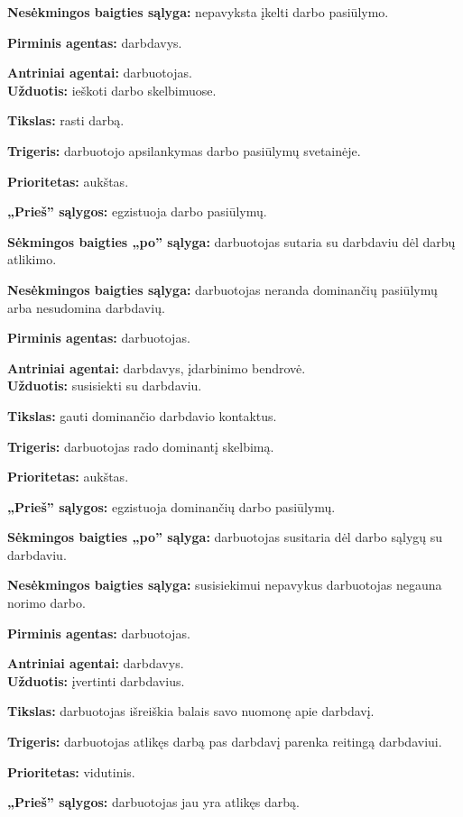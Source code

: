 \documentclass{VUMIFPSkursinis}
\begin{document}
\textbf{Nesėkmingos baigties sąlyga:} nepavyksta įkelti darbo pasiūlymo.

\textbf{Pirminis agentas:} darbdavys.

\textbf{Antriniai agentai:} darbuotojas.
\\

\textbf{Užduotis:} ieškoti darbo skelbimuose.

\textbf{Tikslas:} rasti darbą.

\textbf{Trigeris:} darbuotojo apsilankymas darbo pasiūlymų svetainėje.

\textbf{Prioritetas:} aukštas.

\textbf{„Prieš” sąlygos:} egzistuoja darbo pasiūlymų.

\textbf{Sėkmingos baigties „po” sąlyga:} darbuotojas sutaria su darbdaviu dėl darbų atlikimo.

\textbf{Nesėkmingos baigties sąlyga:} darbuotojas neranda dominančių pasiūlymų arba nesudomina darbdavių.

\textbf{Pirminis agentas:} darbuotojas.

\textbf{Antriniai agentai:} darbdavys, įdarbinimo bendrovė.
\\

\textbf{Užduotis:} susisiekti su darbdaviu.

\textbf{Tikslas:} gauti dominančio darbdavio kontaktus.

\textbf{Trigeris:} darbuotojas rado dominantį skelbimą.

\textbf{Prioritetas:} aukštas.

\textbf{„Prieš” sąlygos:} egzistuoja dominančių darbo pasiūlymų.

\textbf{Sėkmingos baigties „po” sąlyga:} darbuotojas susitaria dėl darbo sąlygų su darbdaviu.

\textbf{Nesėkmingos baigties sąlyga:} susisiekimui nepavykus darbuotojas negauna norimo darbo.

\textbf{Pirminis agentas:} darbuotojas.

\textbf{Antriniai agentai:} darbdavys.
\\

\textbf{Užduotis:} įvertinti darbdavius.

\textbf{Tikslas:} darbuotojas išreiškia balais savo nuomonę apie darbdavį.

\textbf{Trigeris:} darbuotojas atlikęs darbą pas darbdavį parenka reitingą darbdaviui.

\textbf{Prioritetas:} vidutinis.

\textbf{„Prieš” sąlygos:} darbuotojas jau yra atlikęs darbą.
\end{document}
